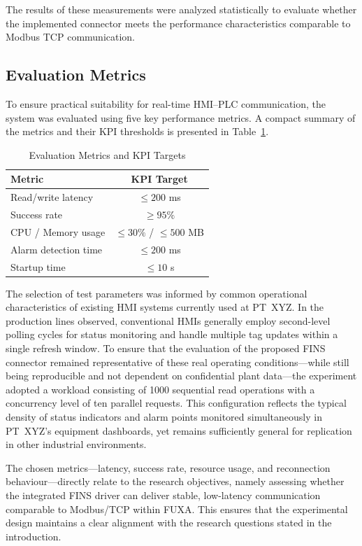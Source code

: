 The results of these measurements were analyzed statistically to evaluate whether the implemented connector meets the performance characteristics comparable to Modbus TCP communication.

\subsection{Evaluation Metrics}
To ensure practical suitability for real-time HMI–PLC communication, the system was evaluated using five key performance metrics. A compact summary of the metrics and their KPI thresholds is presented in Table~\ref{tab:eval-metrics-compact}.

\begin{table}[H]
\centering
\caption{Evaluation Metrics and KPI Targets}
\label{tab:eval-metrics-compact}
\begin{tabular}{|l|c|}
\hline
\textbf{Metric} & \textbf{KPI Target} \\ \hline

Read/write latency & $\leq 200$ ms \\ \hline
Success rate & $\geq 95\%$ \\ \hline
CPU / Memory usage & $\leq 30\%$ / $\leq 500$ MB \\ \hline
Alarm detection time & $\leq 200$ ms \\ \hline
Startup time & $\leq 10$ s \\ \hline

\end{tabular}
\end{table}


The selection of test parameters was informed by common operational characteristics of existing HMI systems currently used at PT~XYZ. In the production lines observed, conventional HMIs generally employ second-level polling cycles for status monitoring and handle multiple tag updates within a single refresh window. To ensure that the evaluation of the proposed FINS connector remained representative of these real operating conditions—while still being reproducible and not dependent on confidential plant data—the experiment adopted a workload consisting of 1000 sequential read operations with a concurrency level of ten parallel requests. This configuration reflects the typical density of status indicators and alarm points monitored simultaneously in PT~XYZ’s equipment dashboards, yet remains sufficiently general for replication in other industrial environments.

The chosen metrics—latency, success rate, resource usage, and reconnection behaviour—directly relate to the research objectives, namely assessing whether the integrated FINS driver can deliver stable, low-latency communication comparable to Modbus/TCP within FUXA. This ensures that the experimental design maintains a clear alignment with the research questions stated in the introduction.


